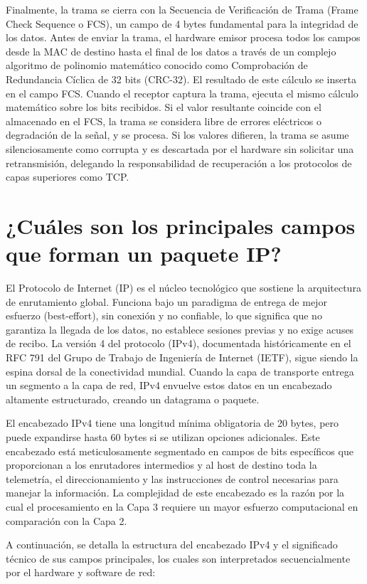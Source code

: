\documentclass[a4paper,12pt]{article}
\begin{document}
Finalmente, la trama se cierra con la Secuencia de Verificación de Trama (Frame Check Sequence o FCS), un campo de 4 bytes fundamental para la integridad de los datos. Antes de enviar la trama, el hardware emisor procesa todos los campos desde la MAC de destino hasta el final de los datos a través de un complejo algoritmo de polinomio matemático conocido como Comprobación de Redundancia Cíclica de 32 bits (CRC-32). El resultado de este cálculo se inserta en el campo FCS. Cuando el receptor captura la trama, ejecuta el mismo cálculo matemático sobre los bits recibidos. Si el valor resultante coincide con el almacenado en el FCS, la trama se considera libre de errores eléctricos o degradación de la señal, y se procesa. Si los valores difieren, la trama se asume silenciosamente como corrupta y es descartada por el hardware sin solicitar una retransmisión, delegando la responsabilidad de recuperación a los protocolos de capas superiores como TCP.

\section{¿Cuáles son los principales campos que forman un paquete IP?}

El Protocolo de Internet (IP) es el núcleo tecnológico que sostiene la arquitectura de enrutamiento global. Funciona bajo un paradigma de entrega de mejor esfuerzo (best-effort), sin conexión y no confiable, lo que significa que no garantiza la llegada de los datos, no establece sesiones previas y no exige acuses de recibo. La versión 4 del protocolo (IPv4), documentada históricamente en el RFC 791 del Grupo de Trabajo de Ingeniería de Internet (IETF), sigue siendo la espina dorsal de la conectividad mundial. Cuando la capa de transporte entrega un segmento a la capa de red, IPv4 envuelve estos datos en un encabezado altamente estructurado, creando un datagrama o paquete. 

El encabezado IPv4 tiene una longitud mínima obligatoria de 20 bytes, pero puede expandirse hasta 60 bytes si se utilizan opciones adicionales. Este encabezado está meticulosamente segmentado en campos de bits específicos que proporcionan a los enrutadores intermedios y al host de destino toda la telemetría, el direccionamiento y las instrucciones de control necesarias para manejar la información. La complejidad de este encabezado es la razón por la cual el procesamiento en la Capa 3 requiere un mayor esfuerzo computacional en comparación con la Capa 2.

A continuación, se detalla la estructura del encabezado IPv4 y el significado técnico de sus campos principales, los cuales son interpretados secuencialmente por el hardware y software de red:
\end{document}
